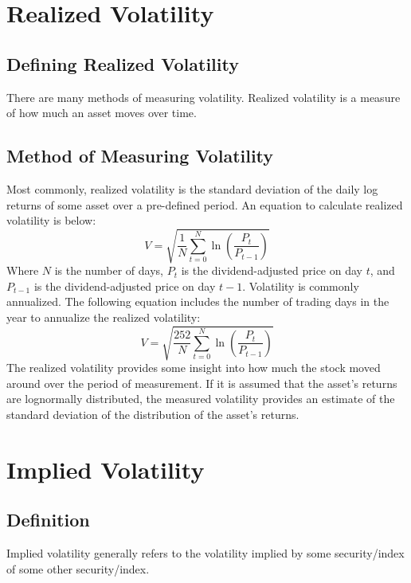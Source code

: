 \documentclass[11pt, oneside]{book}
\begin{document}
\section{Realized Volatility}\label{Defining-Realized}
\subsection{Defining Realized Volatility}\label{Defining-Realized-Define}
There are many methods of measuring volatility. Realized volatility is a measure of how much an asset moves over time. 

\subsection{Method of Measuring Volatility}\label{Defining-Realized-Method}
Most commonly, realized volatility is the standard deviation of the daily log returns of some asset over a pre-defined period. An equation to calculate realized volatility is below:
\begin{equation} 
V=\sqrt{\frac{1}{N}\sum_{t=0}^{N}{\ln({\frac{P_{t}}{P_{t-1}}})}}
\end{equation}\label{Eq-Volatility}
Where $N$ is the number of days, $P_t$ is the dividend-adjusted price on day $t$, and $P_{t-1}$ is the dividend-adjusted price on day $t-1$. Volatility is commonly annualized. The following equation includes the number of trading days in the year to annualize the realized volatility:
\begin{equation} 
V=\sqrt{\frac{252}{N}\sum_{t=0}^{N}{\ln({\frac{P_{t}}{P_{t-1}}})}}
\end{equation}\label{Eq-VolatilityAnnualized}
The realized volatility provides some insight into how much the stock moved around over the period of measurement. If it is assumed that the asset's returns are lognormally distributed, the measured volatility provides an estimate of the standard deviation of the distribution of the asset's returns.

\section{Implied Volatility} \label{Define-IV}
\subsection{Definition} \label{Define-IV-Define}
Implied volatility generally refers to the volatility implied by some security/index of some other security/index. 
\end{document}
